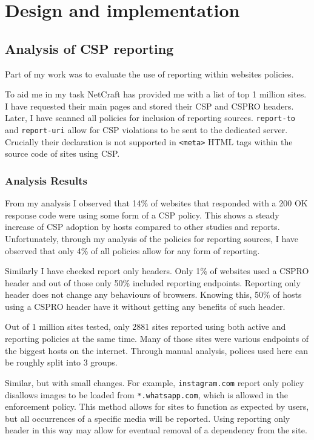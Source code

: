 \chapter{Design and implementation}

\section{Analysis of CSP reporting}

Part of my work was to evaluate the use of reporting within websites policies.

To aid me in my task NetCraft has provided me with a list of top 1 million sites.
I have requested their main pages and stored their CSP and CSPRO headers.
Later, I have scanned all policies for inclusion of reporting sources.
\texttt{report-to} and \texttt{report-uri} allow for CSP violations to be sent to the dedicated server.
Crucially their declaration is not supported in \texttt{<meta>} HTML tags within the source code of sites using CSP.

\subsection{Analysis Results}

From my analysis I observed that 14\% of websites that responded with a 200 OK response code were using some form of a CSP policy.
This shows a steady increase of CSP adoption by hosts compared to other studies and reports.
Unfortunately, through my analysis of the policies for reporting sources, I have observed that only 4\% of all policies allow for any form of reporting.

Similarly I have checked report only headers. 
Only 1\% of websites used a CSPRO header and out of those only 50\% included reporting endpoints.
Reporting only header does not change any behaviours of browsers. 
Knowing this, 50\% of hosts using a CSPRO header have it without getting any benefits of such header.

Out of 1 million sites tested, only 2881 sites reported using both active and reporting policies at the same time.
Many of those sites were various endpoints of the biggest hosts on the internet.
Through manual analysis, polices used here can be roughly split into 3 groups.

Similar, but with small changes.
For example, \texttt{instagram.com} report only policy disallows images to be loaded from \texttt{*.whatsapp.com}, which is allowed in the enforcement policy.
This method allows for sites to function as expected by users, but all occurrences of a specific media will be reported.
Using reporting only header in this way may allow for eventual removal of a dependency from the site.

